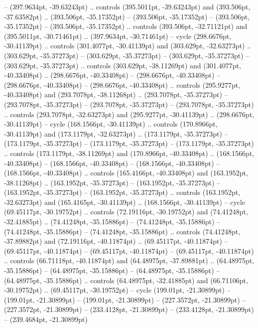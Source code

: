  -- (397.9634pt, -39.63243pt) .. controls (395.5011pt, -39.63243pt) and (393.506pt, -37.63582pt) .. (393.506pt, -35.17352pt)
 -- (393.506pt, -35.17352pt)
 -- (393.506pt, -35.17352pt)
 -- (393.506pt, -35.17352pt) .. controls (393.506pt, -32.71121pt) and (395.5011pt, -30.71461pt) .. (397.9634pt, -30.71461pt) -- cycle
(298.6676pt, -30.41139pt) .. controls (301.4077pt, -30.41139pt) and (303.629pt, -32.63273pt) .. (303.629pt, -35.37273pt)
 -- (303.629pt, -35.37273pt)
 -- (303.629pt, -35.37273pt)
 -- (303.629pt, -35.37273pt) .. controls (303.629pt, -38.11269pt) and (301.4077pt, -40.33408pt) .. (298.6676pt, -40.33408pt)
 -- (298.6676pt, -40.33408pt)
 -- (298.6676pt, -40.33408pt)
 -- (298.6676pt, -40.33408pt) .. controls (295.9277pt, -40.33408pt) and (293.7078pt, -38.11268pt) .. (293.7078pt, -35.37273pt)
 -- (293.7078pt, -35.37273pt)
 -- (293.7078pt, -35.37273pt)
 -- (293.7078pt, -35.37273pt) .. controls (293.7078pt, -32.63273pt) and (295.9277pt, -30.41139pt) .. (298.6676pt, -30.41139pt) -- cycle
(168.1566pt, -30.41139pt) .. controls (170.8966pt, -30.41139pt) and (173.1179pt, -32.63273pt) .. (173.1179pt, -35.37273pt)
 -- (173.1179pt, -35.37273pt)
 -- (173.1179pt, -35.37273pt)
 -- (173.1179pt, -35.37273pt) .. controls (173.1179pt, -38.11269pt) and (170.8966pt, -40.33408pt) .. (168.1566pt, -40.33408pt)
 -- (168.1566pt, -40.33408pt)
 -- (168.1566pt, -40.33408pt)
 -- (168.1566pt, -40.33408pt) .. controls (165.4166pt, -40.33408pt) and (163.1952pt, -38.11268pt) .. (163.1952pt, -35.37273pt)
 -- (163.1952pt, -35.37273pt)
 -- (163.1952pt, -35.37273pt)
 -- (163.1952pt, -35.37273pt) .. controls (163.1952pt, -32.63273pt) and (165.4165pt, -30.41139pt) .. (168.1566pt, -30.41139pt) -- cycle
(69.45117pt, -30.19752pt) .. controls (72.19116pt, -30.19752pt) and (74.41248pt, -32.41885pt) .. (74.41248pt, -35.15886pt)
 -- (74.41248pt, -35.15886pt)
 -- (74.41248pt, -35.15886pt)
 -- (74.41248pt, -35.15886pt) .. controls (74.41248pt, -37.89882pt) and (72.19116pt, -40.11874pt) .. (69.45117pt, -40.11874pt)
 -- (69.45117pt, -40.11874pt)
 -- (69.45117pt, -40.11874pt)
 -- (69.45117pt, -40.11874pt) .. controls (66.71118pt, -40.11874pt) and (64.48975pt, -37.89881pt) .. (64.48975pt, -35.15886pt)
 -- (64.48975pt, -35.15886pt)
 -- (64.48975pt, -35.15886pt)
 -- (64.48975pt, -35.15886pt) .. controls (64.48975pt, -32.41885pt) and (66.71106pt, -30.19752pt) .. (69.45117pt, -30.19752pt) -- cycle
(199.01pt, -21.30899pt) -- (199.01pt, -21.30899pt)
 -- (199.01pt, -21.30899pt)
 -- (227.3572pt, -21.30899pt)
 -- (227.3572pt, -21.30899pt)
 -- (233.4128pt, -21.30899pt)
 -- (233.4128pt, -21.30899pt)
 -- (239.4684pt, -21.30899pt)

